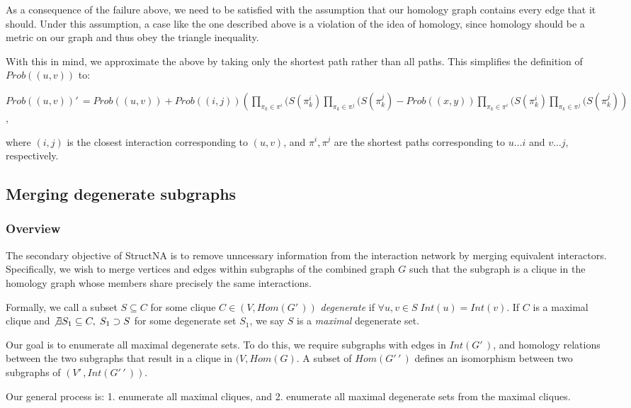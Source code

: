 \documentclass[12pt,twoside]{article}
\begin{document}
As a consequence of the failure above, we need to be satisfied with the assumption that our homology graph contains every edge that it should. Under this assumption, a case like the one described above is a violation of the idea of homology, since homology should be a metric on our graph and thus obey the triangle inequality.
 
With this in mind, we approximate the above by taking only the shortest path rather than all paths. This simplifies the definition of $Prob((u,v))$ to:

$Prob((u,v))'\,\! = Prob((u,v)) + \displaystyle Prob((i,j)) \left( \prod_{\pi_k \in \pi^i}(S(\pi_k^i) \prod_{\pi_k \in \pi^j}(S(\pi_k^j) - Prob((x,y)) \prod_{\pi_k \in \pi^i}(S(\pi_k^i) \prod_{\pi_k \in \pi^j}(S(\pi_k^j) \right)$,

where $(i,j)$ is the closest interaction corresponding to $(u,v)$, and $\pi^i, \pi^j$ are the shortest paths corresponding to $u \ldots i$ and $v \ldots j$, respectively.

\subsection{Merging degenerate subgraphs}

\subsubsection{Overview}

The secondary objective of StructNA is to remove unncessary information from the interaction network by merging equivalent interactors. Specifically, we wish to merge vertices and edges within subgraphs of the combined graph $G$ such that the subgraph is a clique in the homology graph whose members share precisely the same interactions.

Formally, we call a subset $S \subseteq C$ for some clique $C \in (V,Hom(G'\,\!))$ \emph{degenerate} if $\forall u,v \in S \; Int(u) = Int(v)$. If $C$ is a maximal clique and $\not \exists S_1 \subseteq C, \; S_1 \supset S$ for some degenerate set $S_1$, we say $S$ is a \emph{maximal} degenerate set.

Our goal is to enumerate all maximal degenerate sets. To do this, we require subgraphs with edges in $Int(G'\,\!)$, and homology relations between the two subgraphs that result in a clique in $(V,Hom(G)$. A subset of $Hom(G'\,\!'\,\!)$ defines an isomorphism between two subgraphs of $(V'\,\!, Int(G'\,\!'\,\!))$.

Our general process is: 1. enumerate all maximal cliques, and 2. enumerate all maximal degenerate sets from the maximal cliques.
\end{document}
